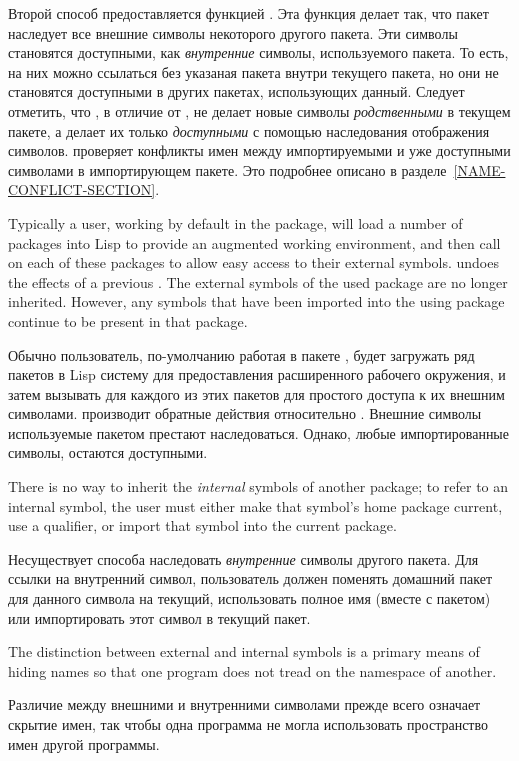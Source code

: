 Второй способ предоставляется функцией . Эта функция делает
так, что пакет наследует все внешние символы некоторого другого пакета. Эти
символы становятся доступными, как \emph{внутренние} символы, используемого
пакета. То есть, на них можно ссылаться без указаная пакета внутри текущего
пакета, но они не становятся доступными в других пакетах, использующих
данный. Следует отметить, что , в отличие от , не
делает новые символы \emph{родственными} в текущем пакете, а делает их только
\emph{доступными} с помощью наследования отображения символов.
 проверяет конфликты имен между импортируемыми и уже доступными
символами в импортирующем пакете. Это подробнее описано в
разделе~\ref{NAME-CONFLICT-SECTION}.

Typically a user, working by default in the  package, will
load a number of packages into Lisp to provide an augmented working
environment, and then call  on each of these packages
to allow easy access to their external symbols.
 undoes the effects of a previous .  The
external symbols of the used package are no longer inherited.  However,
any symbols that have been imported into the using package continue to
be present in that package.

Обычно пользователь, по-умолчанию работая в пакете , будет загружать
ряд пакетов в Lisp систему для предоставления расширенного рабочего окружения, и
затем вызывать  для каждого из этих пакетов для простого
доступа к их внешним символами.
 производит обратные действия относительно
. Внешние символы используемые пакетом престают
наследоваться. Однако, любые импортированные символы, остаются доступными.

There is no way to inherit the \emph{internal} symbols of another package;
to refer to an internal symbol, the user must either make that symbol's home
package current, use a qualifier, or import that symbol into the current
package.

Несуществует способа наследовать \emph{внутренние} символы другого пакета. Для
ссылки на внутренний символ, пользователь должен поменять домашний пакет для
данного символа на текущий, использовать полное имя (вместе с пакетом) или
импортировать этот символ в текущий пакет.

\begin{newer}
The distinction between
external and internal symbols is a primary means of hiding names
so that one program does not tread on the namespace of another.

Различие между внешними и внутренними символами прежде всего означает скрытие
имен, так чтобы одна программа не могла использовать пространство имен другой
программы.
\end{newer}

